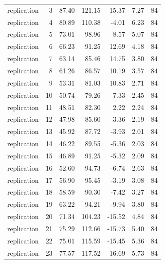 \begin{tabular}{lrrrrrr}
replication & 3 & 87.40 & 121.15 & -15.37 & 7.27 & 84 \\
replication & 4 & 80.89 & 110.38 & -4.01 & 6.23 & 84 \\
replication & 5 & 73.01 & 98.96 & 8.57 & 5.07 & 84 \\
replication & 6 & 66.23 & 91.25 & 12.69 & 4.18 & 84 \\
replication & 7 & 63.14 & 85.46 & 14.75 & 3.80 & 84 \\
replication & 8 & 61.26 & 86.57 & 10.19 & 3.57 & 84 \\
replication & 9 & 53.31 & 81.03 & 10.83 & 2.71 & 84 \\
replication & 10 & 50.74 & 79.26 & 7.33 & 2.45 & 84 \\
replication & 11 & 48.51 & 82.30 & 2.22 & 2.24 & 84 \\
replication & 12 & 47.98 & 85.60 & -3.36 & 2.19 & 84 \\
replication & 13 & 45.92 & 87.72 & -3.93 & 2.01 & 84 \\
replication & 14 & 46.22 & 89.55 & -5.36 & 2.03 & 84 \\
replication & 15 & 46.89 & 91.25 & -5.32 & 2.09 & 84 \\
replication & 16 & 52.60 & 94.73 & -6.74 & 2.63 & 84 \\
replication & 17 & 56.90 & 95.45 & -3.19 & 3.08 & 84 \\
replication & 18 & 58.59 & 90.30 & -7.42 & 3.27 & 84 \\
replication & 19 & 63.22 & 94.21 & -9.94 & 3.80 & 84 \\
replication & 20 & 71.34 & 104.23 & -15.52 & 4.84 & 84 \\
replication & 21 & 75.29 & 112.66 & -15.73 & 5.40 & 84 \\
replication & 22 & 75.01 & 115.59 & -15.45 & 5.36 & 84 \\
replication & 23 & 77.57 & 117.52 & -16.69 & 5.73 & 84 \\
\bottomrule
\end{tabular}
